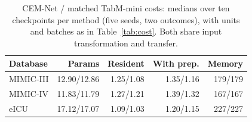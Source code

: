 \begin{table}[tp]
\centering\footnotesize
\setlength{\tabcolsep}{3pt}
\caption{CEM-Net / matched TabM-mini costs: medians over ten checkpoints per method (five seeds, two outcomes), with units and batches as in Table~\ref{tab:cost}. Both share input transformation and transfer.}
\label{tab:matched-cost}
\begin{tabular}{lrrrr}
\toprule
Database & Params & Resident & With prep. & Memory \\
\midrule
MIMIC-III & 12.90/12.86 & 1.25/1.08 & 1.35/1.16 & 179/179 \\
MIMIC-IV & 11.83/11.79 & 1.27/1.21 & 1.39/1.32 & 167/167 \\
eICU & 17.12/17.07 & 1.09/1.03 & 1.20/1.15 & 227/227 \\
\bottomrule
\end{tabular}
\end{table}
